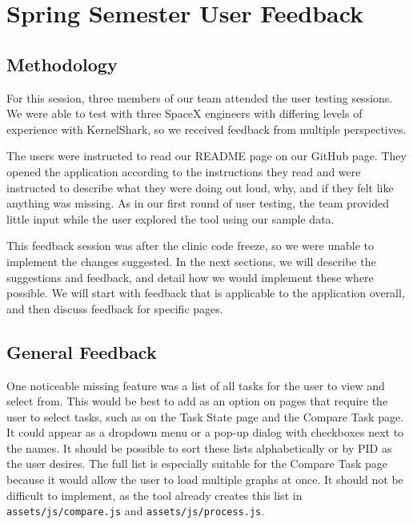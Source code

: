 \documentclass{hmcclinic}
\begin{document}
\chapter{Spring Semester User Feedback}
\section{Methodology}
   For this session, three members of our team attended the user testing sessions.
   We were able to test with three SpaceX engineers with differing levels of
   experience with KernelShark, so we received feedback from multiple perspectives.

   The users were instructed to read our README page on our GitHub page. They
   opened the application according to the instructions they read and were
   instructed to describe what they were doing out loud, why, and if they felt
   like anything was missing. As in our first round of user testing, the team
   provided little input while the user explored the tool using our sample data.

   This feedback session was after the clinic code freeze, so we were unable to
   implement the changes suggested. In the next sections, we will describe the
   suggestions and feedback, and detail how we would implement these where
   possible. We will start with feedback that is applicable to the application
   overall, and then discuss feedback for specific pages.

\section{General Feedback}

One noticeable missing feature was a list of all tasks for the user to view and select from. 
This would be best to add as an option on pages that require the user to select tasks, such 
as on the Task State page and the Compare Task page. It could appear as a dropdown menu or a 
pop-up dialog with checkboxes next to the names. It should be possible to sort these lists 
alphabetically or by PID as the user desires. The full list is especially suitable for the 
Compare Task page because it would allow the user to load multiple graphs at once. It should 
not be difficult to implement, as the tool already creates this list in 
\texttt{assets/js/compare.js} and \texttt{assets/js/process.js}.
\end{document}
